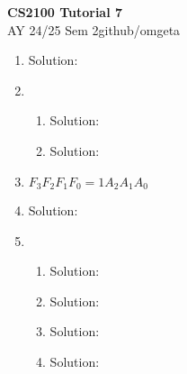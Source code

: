 \documentclass[12pt, a4paper]{article}
\newcommand{\mytitle}{CS2100 Tutorial 7}
\newcommand{\myauthor}{github/omgeta}
\newcommand{\mydate}{AY 24/25 Sem 2}
\begin{document}
\raggedright
\footnotesize
\begin{center}
{\normalsize{\textbf{\mytitle}}} \\
{\footnotesize{\mydate\hspace{2pt}\textemdash\hspace{2pt}\myauthor}}
\end{center}
\begin{enumerate}[Q\arabic*.]
  \item Solution:\\

  \item 
    \begin{enumerate}[(\alph*.)]
      \item Solution:\\

      \item Solution:\\
    \end{enumerate}

  \item $F_3F_2F_1F_0 = 1A_2A_1A_0$

  \item Solution:\\
\pagebreak
  \item 
    \begin{enumerate}[(\alph*.)]
      \item Solution:\\

      \item Solution:\\

      \item Solution:\\

      \item Solution:\\
    \end{enumerate}
\end{enumerate}
\end{document}
